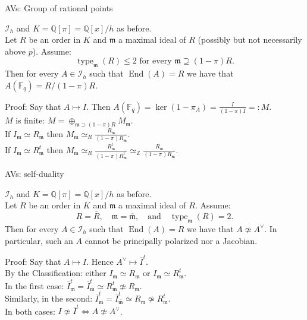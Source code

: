 \documentclass[usenames,dvipsnames]{beamer}
\def\Q{\mathbb{Q}}
\def\Z{\mathbb{Z}}
\def\F{\mathbb{F}}
\DeclareMathOperator{\End}{End}
\DeclareMathOperator{\type}{type}
\renewcommand{\frm}{{\mathfrak m}}
\begin{document}
\begin{frame}{ AVs: Group of rational points }
    \begin{theorem}[ Springer-M. ]
        $\mathcal{I}_h$ and $K=\Q[\pi]=\Q[x]/h$ as before.\\
        \pause Let $R$ be an order in $K$ and $\frm$ a maximal ideal of $R$ (possibly but not necessarily above $p$). 
        \pause Assume:
        \[ \type_\frm(R) \leq 2 \text{ for every }\frm \supseteq (1-\pi)R.\]
        \pause Then for every $A \in \mathcal{I}_h$ such that $\End(A)=R$ we have that $A(\F_q) = R/(1-\pi)R$.
    \end{theorem}
    \pause Proof: Say that $A \mapsto I$. Then $A(\F_q) = \ker(1-\pi_A) = \frac{I}{(1-\pi)I}=:M$.\\
    \pause $M$ is finite: $M=\oplus_{\frm \supset (1-\pi)R} M_\frm$.\\
    \pause If $I_\frm\simeq R_\frm$ then $M_\frm \simeq_R \frac{R_\frm}{(1-\pi)R_\frm}$.\\
    \pause If $I_\frm \simeq R^t_\frm$ then $M_\frm \simeq_R \frac{R^t_\frm}{(1-\pi)R^t_\frm} \simeq_\Z \frac{R_\frm}{(1-\pi)R_\frm}$.
\end{frame}

\begin{frame}{ AVs: self-duality }
    \begin{theorem}[ Springer-M. ]
        $\mathcal{I}_h$ and $K=\Q[\pi]=\Q[x]/h$ as before.\\
        \pause Let $R$ be an order in $K$ and $\frm$ a maximal ideal of $R$. 
        \pause Assume:
        \[ R=\overline{R}, \quad \frm = \overline{\frm},\quad \text{and}\quad \type_\frm(R) = 2 .\]
        \pause Then for every $A \in \mathcal{I}_h$ such that $\End(A)=R$ we have that $A\not\simeq A^\vee$. 
        \pause In particular, such an $A$ cannot be principally polarized nor a Jacobian.
    \end{theorem}
    \pause Proof: Say that $A \mapsto I$. Hence $A^\vee \mapsto \overline{I}^t$.\\
    \pause By the Classification: either $I_\frm\simeq R_\frm$ or $I_\frm\simeq R_\frm^t$.\\
    \pause In the first case: $\overline{I}_\frm^t = \overline{I}_{\overline{\frm}}^t \simeq R^t_\frm \not\simeq R_\frm$.\\
    \pause Similarly, in the second: $\overline{I}_\frm^t = \overline{I}_{\overline{\frm}}^t \simeq R_\frm \not\simeq R_\frm^t$.\\
    \pause In both cases: $I\not\simeq \overline{I}^t \iff A\not \simeq A^\vee$.
\end{frame}
\end{document}
